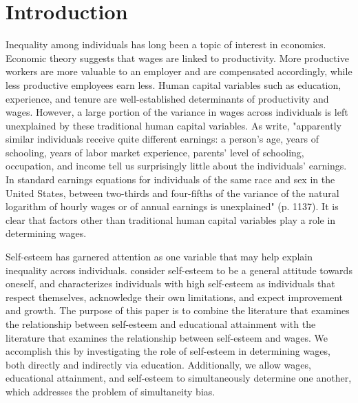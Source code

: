 \documentclass[12pt]{report}
\newcommand{\citee}[1]{\citename{#1} \citeyear{#1}}
\begin{document}
\newpage
\setcounter{page}{1}

\chapter{Introduction}

\begin{comment} This section will contain the motivation and goal of the paper, a brief summary of the structure of the paper, and a brief summary of findings \end{comment}


Inequality among individuals has long been a topic of interest in economics. Economic theory suggests that wages are linked to productivity. More productive workers are more valuable to an employer and are compensated accordingly, while less productive employees earn less. Human capital variables such as education, experience, and tenure are well-established determinants of productivity and wages. However, a large portion of the variance in wages across individuals is left unexplained by these traditional human capital variables. As \citee{BGO2001} write, "apparently similar individuals receive quite different earnings: a person's age, years of schooling, years of labor market experience, parents' level of schooling, occupation, and income tell us surprisingly little about the individuals' earnings. In standard earnings equations for individuals of the same race and sex in the United States, between two-thirds and four-fifths of the variance of the natural logarithm of hourly wages or of annual earnings is unexplained" (p. 1137). It is clear that factors other than traditional human capital variables play a role in determining wages.

Self-esteem has garnered attention as one variable that may help explain inequality across individuals. \citee{R1995} consider self-esteem to be a general attitude towards oneself, and \citee{R1965} characterizes individuals with high self-esteem as individuals that respect themselves, acknowledge their own limitations, and expect improvement and growth.
The purpose of this paper is to combine the literature that examines the relationship between self-esteem and educational attainment with the literature that examines the relationship between self-esteem and wages. We accomplish this by investigating the role of self-esteem in determining wages, both directly and indirectly via education. Additionally, we allow wages, educational attainment, and self-esteem to simultaneously determine one another, which addresses the problem of simultaneity bias.
\end{document}
